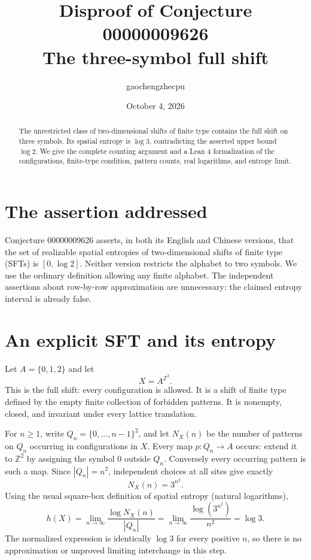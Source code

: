 \documentclass[11pt]{article}
\title{Disproof of Conjecture 00000009626\\\large The three-symbol full shift}
\author{gaochengzhecpu}
\date{October 4, 2026}
\begin{document}
\maketitle
\begin{abstract}
The unrestricted class of two-dimensional shifts of finite type contains the
full shift on three symbols. Its spatial entropy is $\log 3$, contradicting
the asserted upper bound $\log 2$. We give the complete counting argument
and a Lean 4 formalization of the configurations, finite-type condition,
pattern counts, real logarithms, and entropy limit.
\end{abstract}

\section*{The assertion addressed}
Conjecture 00000009626 asserts, in both its English and Chinese versions,
that the set of realizable spatial entropies of two-dimensional shifts of
finite type (SFTs) is $[0,\log 2]$. Neither version restricts the alphabet to
two symbols. We use the ordinary definition allowing any finite alphabet.
The independent assertions about row-by-row approximation are unnecessary:
the claimed entropy interval is already false.

\section*{An explicit SFT and its entropy}
Let $A=\{0,1,2\}$ and let
\[
                 X=A^{\mathbb Z^2}.
\]
This is the full shift: every configuration is allowed. It is a shift of
finite type defined by the empty finite collection of forbidden patterns.
It is nonempty, closed, and invariant under every lattice translation.

For $n\geq 1$, write $Q_n=\{0,\ldots,n-1\}^2$, and let $N_X(n)$ be the
number of patterns on $Q_n$ occurring in configurations in $X$.
Every map $p:Q_n\to A$ occurs: extend it to $\mathbb Z^2$ by assigning
the symbol $0$ outside $Q_n$. Conversely every occurring pattern is such a
map. Since $|Q_n|=n^2$, independent choices at all sites give exactly
\[
                         N_X(n)=3^{n^2}.
\]
Using the usual square-box definition of spatial entropy (natural logarithms),
\[
 h(X)=\lim_{n\to\infty}\frac{\log N_X(n)}{|Q_n|}
     =\lim_{n\to\infty}\frac{\log(3^{n^2})}{n^2}
     =\log 3.
\]
The normalized expression is identically $\log 3$ for every positive $n$,
so there is no approximation or unproved limiting interchange in this step.
\end{document}
